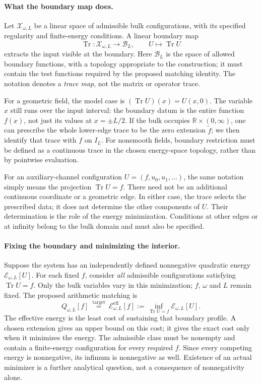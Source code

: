 \paragraph{What the boundary map does.}
Let $\mathcal X_{\omega,L}$ be a linear space of admissible bulk
configurations, with its specified regularity and finite-energy
conditions. A linear boundary map
\[
\operatorname{Tr}:\mathcal X_{\omega,L}\longrightarrow\mathcal B_L,
\qquad U\longmapsto\operatorname{Tr}U
\]
extracts the input visible at the boundary. Here $\mathcal B_L$ is
the space of allowed boundary functions, with a topology appropriate
to the construction; it must contain the test functions required
by the proposed matching identity. The notation denotes a
\emph{trace map}, not the matrix or operator trace.

For a geometric field, the model case is
$(\operatorname{Tr}U)(x)=U(x,0)$. The variable $x$ still runs over
the input interval: the boundary datum is the entire function
$f(x)$, not just its values at $x=\pm L/2$. If the bulk occupies
$\mathbb R\times(0,\infty)$, one can prescribe the whole lower-edge
trace to be the zero extension $\widetilde f$; we then identify
that trace with $f$ on $I_L$. For nonsmooth fields, boundary
restriction must be defined as a continuous trace in the chosen
energy-space topology, rather than by pointwise evaluation.

For an auxiliary-channel configuration
$U=(f,u_0,u_1,\ldots)$, the same notation simply means the projection
$\operatorname{Tr}U=f$. There need not be an additional continuous
coordinate or a geometric edge. In either case, the trace selects
the prescribed data; it does not determine the other components
of $U$. Their determination is the role of the energy minimization.
Conditions at other edges or at infinity belong to the bulk
domain and must also be specified.

\paragraph{Fixing the boundary and minimizing the interior.}
Suppose the system has an independently defined nonnegative
quadratic energy $\mathcal E_{\omega,L}[U]$. For each fixed $f$,
consider \emph{all} admissible configurations satisfying
$\operatorname{Tr}U=f$. Only the bulk variables vary in this
minimization; $f$, $\omega$ and $L$ remain fixed. The proposed
arithmetic matching is
\begin{equation}
Q_{\omega,L}[f]
\ \stackrel{\text{target}}{=}\
\mathcal E_{\omega,L}^{\mathrm{eff}}[f]
:=\inf_{\operatorname{Tr}U=f}\mathcal E_{\omega,L}[U].
\label{eq:rh-bulk-target}
\end{equation}
The effective energy is the least cost of sustaining that boundary
profile. A chosen extension gives an upper bound on this cost;
it gives the exact cost only when it minimizes the energy.
The admissible class must be nonempty and contain a finite-energy
configuration for every required $f$. Since every competing energy
is nonnegative, its infimum is nonnegative as well. Existence of an
actual minimizer is a further analytical question, not a consequence
of nonnegativity alone.

